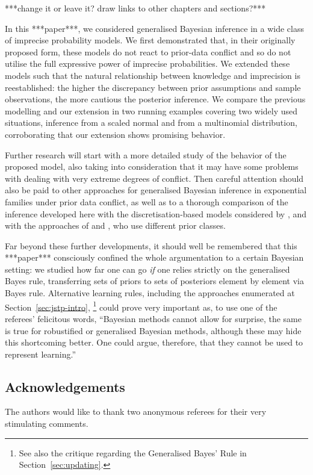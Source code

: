 ***change it or leave it? draw links to other chapters and sections?***

In this ***paper***, we considered generalised Bayesian inference
in a wide class of imprecise probability models. We first
demonstrated that, in their originally proposed form, these models
do not react to prior-data conflict and so do not utilise
the full expressive power of imprecise probabilities. We
extended these models such that the natural relationship between
knowledge and imprecision is reestablished: the higher the
discrepancy between prior assumptions and sample observations, the
more cautious the posterior inference. We compare the previous
modelling and our extension in two running examples covering two
widely used situations, inference from a scaled normal and
from a multinomial distribution, corroborating that our extension
shows promising behavior.

Further research will start with a more detailed study of
the behavior of the proposed model, also taking into consideration
that it may have some problems with dealing with very extreme
degrees of conflict. Then careful attention should also be paid to
other approaches for generalised Bayesian inference in exponential
families \parencite{1993:coolen, 1997:boratynska} under prior data
conflict, as well as to a thorough comparison of the inference
developed here with the discretisation-based models considered by
\textcite{2005:whitcomb}, and with the approaches of \textcite{1991:pericchi}
and \textcite{1994:coolen}, who use different prior classes.

Far beyond these further developments, it should well be
remembered that this ***paper*** consciously confined the whole
argumentation to a certain Bayesian setting: we studied how far
one can go \emph{if} one relies strictly on the generalised Bayes
rule, transferring sets of priors to sets of posteriors element by
element via Bayes rule. Alternative learning
rules, including the approaches enumerated at Section~\ref{sec:jstp-intro},%
\footnote{See also the critique regarding the Generalised Bayes' Rule in Section~\ref{sec:updating}.}
could prove very important as, to use one of the referees'
felicitous words, ``Bayesian methods cannot allow for surprise, the same is
true for robustified or generalised Bayesian methods, although these
may hide this shortcoming better. One could argue, therefore, that
they cannot be used to represent learning.''

\subsection*{Acknowledgements}
The authors would like to thank two anonymous referees for their very stimulating comments.




